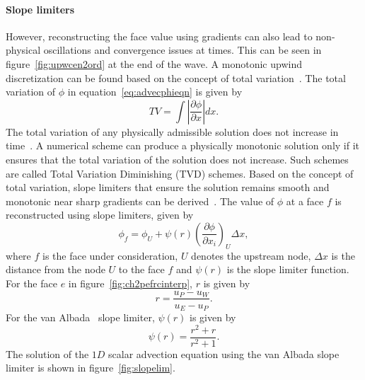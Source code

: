 \paragraph{Slope limiters}
However, reconstructing the face value using gradients can also lead to non-physical oscillations and convergence issues at times. This can be seen in figure~\ref{fig:upwcen2ord} at the end of the wave. A monotonic upwind discretization can be found based on the concept of total variation~\cite{hirsch1997numerical}. The total variation of $\phi$ in equation~\ref{eq:advecphieqn} is given by
\begin{equation}
TV = \int\left|\frac{\partial \phi}{\partial x}\right|dx.
\end{equation}
The total variation of any physically admissible solution does not increase in time~\cite{hirsch1997numerical,leveque2002finite}. A numerical scheme can produce a physically monotonic solution only if it ensures that the total variation of the solution does not increase. Such schemes are called Total Variation Diminishing (TVD) schemes. Based on the concept of total variation, slope limiters that ensure the solution remains smooth and monotonic near sharp gradients can be derived~\cite{hirsch1997numerical,leveque2002finite}. The value of $\phi$ at a face $f$ is reconstructed using slope limiters, given by
\begin{equation*}
\phi_f = \phi_U + \psi(r)\left(\frac{\partial \phi}{\partial x_i}\right)_U\Delta x,
\end{equation*}
where $f$ is the face under consideration, $U$ denotes the upstream node, $\Delta x$ is the distance from the node $U$ to the face $f$ and $\psi(r)$ is the slope limiter function. For the face $e$ in figure~\ref{fig:ch2pefrcinterp}, $r$ is given by
\begin{equation*}
r = \frac{u_P - u_W}{u_E - u_P}.
\end{equation*}
For the van Albada~\cite{vanalbada} slope limiter, $\psi(r)$ is given by
\begin{equation*}
\psi(r) = \frac{r^2 + r}{r^2 + 1}.
\end{equation*}
The solution of the $1D$ scalar advection equation using the van Albada slope limiter is shown in figure~\ref{fig:slopelim}.
